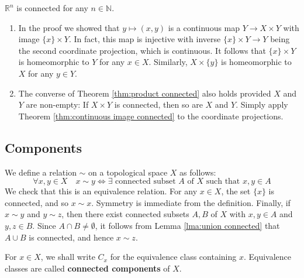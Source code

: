 \documentclass[a4paper,11pt]{article}
\begin{document}
\begin{example}
    $\mathbb{R}^{n}$ is connected for any $n \in \mathbb{N}$.
\end{example}

\begin{remark}
    \begin{enumerate}
        \item In the proof we showed that $y \mapsto(x, y)$ is a continuous map $Y \rightarrow X \times Y$ with image $\{x\} \times Y$. In fact, this map is injective with inverse $\{x\} \times Y \rightarrow Y$ being the second coordinate projection, which is continuous. It follows that $\{x\} \times Y$ is homeomorphic to $Y$ for any $x \in X$. Similarly, $X \times\{y\}$ is homeomorphic to $X$ for any $y \in Y$.
      
        \item The converse of Theorem \ref{thm:product connected} also holds provided $X$ and $Y$ are non-empty: If $X \times Y$ is connected, then so are $X$ and $Y$. Simply apply Theorem \ref{thm:continuous image connected} to the coordinate projections.
      \end{enumerate}
\end{remark}

\subsection{Components}
We define a relation $\sim$ on a topological space $X$ as follows:
$$
\forall x, y \in X \quad x \sim y \Longleftrightarrow \exists \text { connected subset } A \text { of } X \text { such that } x, y \in A
$$
We check that this is an equivalence relation. For any $x \in X$, the set $\{x\}$ is connected, and so $x \sim x$. Symmetry is immediate from the definition. Finally, if $x \sim y$ and $y \sim z$, then there exist connected subsets $A, B$ of $X$ with $x, y \in A$ and $y, z \in B$. Since $A \cap B \neq \emptyset$, it follows from Lemma \ref{lma:union connected} that $A \cup B$ is connected, and hence $x \sim z$. 
\begin{definition}
    For $x \in X$, we shall write $C_{x}$ for the equivalence class containing $x$. Equivalence classes are called \textbf{connected components} of $X$.
\end{definition}
\end{document}
